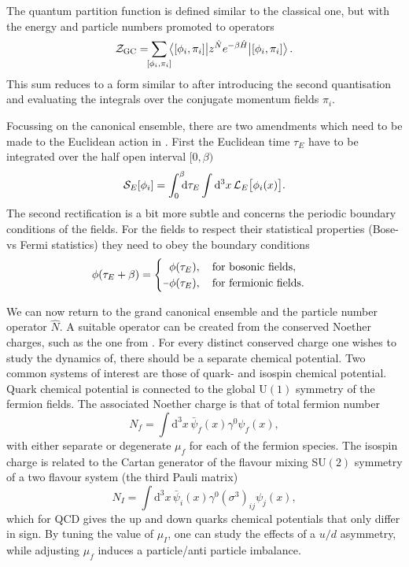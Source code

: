 The quantum partition function is defined similar to the classical one, but with
the energy and particle numbers promoted to operators
%
\begin{equation}
  \mathcal{Z}_{\text{GC}} = \sum_{\mathclap{[\phi_i, \pi_i]}}
  \big\langle [\phi_i, \pi_i] \big|
    z^{\hat{N}} e^{-\beta \hat{H}} \big| [\phi_i, \pi_i] \big\rangle \,.
\end{equation}
%
This sum reduces to a form similar to  after introducing
the second quantisation and evaluating the integrals over the conjugate momentum
fields $\pi_i$.

Focussing on the canonical ensemble, there are two amendments which need to be
made to the Euclidean action in . First the Euclidean time
$\tau_E$ have to be integrated over the half open interval $[0, \beta)$
%
\begin{equation}
  \mathcal{S}_E[\phi_i] = \int_{\mathrlap{0}}^{\mathrlap{\beta}} \mathrm{d} \tau_E \int \mathrm{d}^3 x \,
    \mathcal{L}_E\big[\phi_i(x)\big].
\end{equation}
%
The second rectification is a bit more subtle and concerns the periodic boundary
conditions of the fields. For the fields to respect their statistical properties
(Bose- vs Fermi statistics) they need to obey the boundary conditions
%
\begin{equation} \label{eq:boundary-conditions}
  \phi(\tau_E + \beta) = \begin{cases}
    \hphantom{\minus}\phi(\tau_E), \hskip1em \text{for bosonic fields}, \\
    \minus\phi(\tau_E), \hskip1em \text{for fermionic fields}.
  \end{cases}
\end{equation}

We can now return to the grand canonical ensemble and the particle number
operator $\hat{N}$. A suitable operator can be created from the conserved
Noether charges, such as the one from . For every
distinct conserved charge one wishes to study the dynamics of, there should be a
separate chemical potential. Two common systems of interest are those of quark-
and isospin chemical potential. Quark chemical potential is connected to the
global U$(1)$ symmetry of the fermion fields. The associated Noether charge is
that of total fermion number
%
\begin{equation} \label{eq:quark-number-density-op}
  N_f = \int \mathrm{d}^3 x \, \bar{\psi}_f(x) \gamma^0 \psi_f(x),
\end{equation}
%
with either separate or degenerate $\mu_f$ for each of the fermion species. The
isospin charge is related to the Cartan generator of the flavour mixing SU$(2)$
symmetry of a two flavour system (the third Pauli matrix)
%
\begin{equation}
  N_I  = \int \mathrm{d}^3 x \, \bar{\psi}_i(x) \gamma^0 (\sigma^3)_{ij}
    \psi_j(x),
\end{equation}
%
which for QCD gives the up and down quarks chemical potentials that only differ
in sign. By tuning the value of $\mu_I$, one can study the effects of a $u/d$
asymmetry, while adjusting $\mu_f$ induces a particle/anti particle imbalance.

